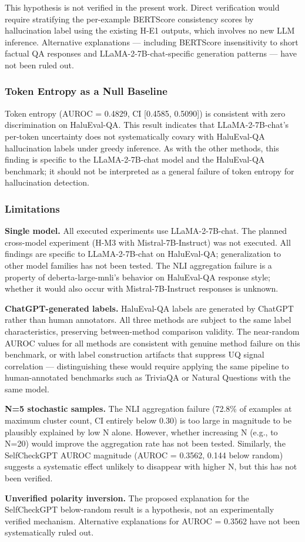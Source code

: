 This hypothesis is not verified in the present work. Direct verification would require stratifying the per-example BERTScore consistency scores by hallucination label using the existing H-E1 outputs, which involves no new LLM inference. Alternative explanations — including BERTScore insensitivity to short factual QA responses and LLaMA-2-7B-chat-specific generation patterns — have not been ruled out.

\subsubsection{Token Entropy as a Null Baseline}

Token entropy (AUROC = 0.4829, CI [0.4585, 0.5090]) is consistent with zero discrimination on HaluEval-QA. This result indicates that LLaMA-2-7B-chat's per-token uncertainty does not systematically covary with HaluEval-QA hallucination labels under greedy inference. As with the other methods, this finding is specific to the LLaMA-2-7B-chat model and the HaluEval-QA benchmark; it should not be interpreted as a general failure of token entropy for hallucination detection.

\subsubsection{Limitations}

\textbf{Single model.} All executed experiments use LLaMA-2-7B-chat. The planned cross-model experiment (H-M3 with Mistral-7B-Instruct) was not executed. All findings are specific to LLaMA-2-7B-chat on HaluEval-QA; generalization to other model families has not been tested. The NLI aggregation failure is a property of deberta-large-mnli's behavior on HaluEval-QA response style; whether it would also occur with Mistral-7B-Instruct responses is unknown.

\textbf{ChatGPT-generated labels.} HaluEval-QA labels are generated by ChatGPT rather than human annotators. All three methods are subject to the same label characteristics, preserving between-method comparison validity. The near-random AUROC values for all methods are consistent with genuine method failure on this benchmark, or with label construction artifacts that suppress UQ signal correlation — distinguishing these would require applying the same pipeline to human-annotated benchmarks such as TriviaQA or Natural Questions with the same model.

\textbf{N=5 stochastic samples.} The NLI aggregation failure (72.8\% of examples at maximum cluster count, CI entirely below 0.30) is too large in magnitude to be plausibly explained by low N alone. However, whether increasing N (e.g., to N=20) would improve the aggregation rate has not been tested. Similarly, the SelfCheckGPT AUROC magnitude (AUROC = 0.3562, 0.144 below random) suggests a systematic effect unlikely to disappear with higher N, but this has not been verified.

\textbf{Unverified polarity inversion.} The proposed explanation for the SelfCheckGPT below-random result is a hypothesis, not an experimentally verified mechanism. Alternative explanations for AUROC = 0.3562 have not been systematically ruled out.

